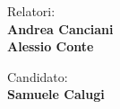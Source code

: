 \begin{titlepage}

    \begin{minipage}[t]{0.47\textwidth}
        {\large{Relatori:}{\normalsize\vspace{3mm}
                \bf\\ \large{Andrea Canciani \vspace{2mm}\\Alessio Conte}}}
    \end{minipage}
    \hfill
    \begin{minipage}[t]{0.47\textwidth}\raggedleft
        {\large{Candidato:}{\normalsize\vspace{3mm} \bf\\ \large{ Samuele Calugi\\ }}}
    \end{minipage}

    \vspace{30mm}
    \hrulefill
    \\

\end{titlepage}